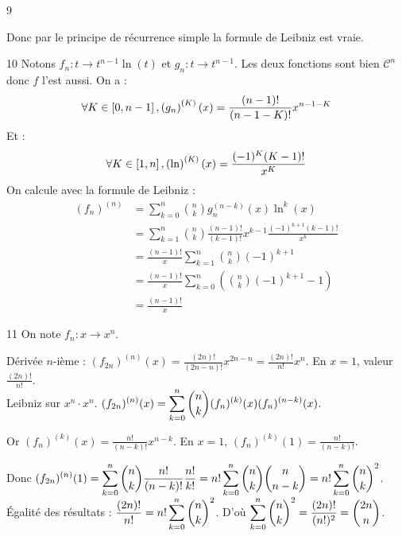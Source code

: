 \begin{correction}{9}
\begin{enumerate}
    Donc par le principe de récurrence simple la formule de Leibniz est vraie.
\end{enumerate}
\end{correction}

\begin{correction}{10}
Notons $f_n: t \to t^{n-1} \ln(t)$ et $g_n: t \to t^{n-1}$.    
Les deux fonctions sont bien $\mathscr C^n$ donc $f$ l'est aussi.
On a :
\[\forall K \in \left[0, n-1\right], \left(g_n\right)^{(K)}(x) = \frac{(n-1)!}{(n-1-K)!}x^{n-1-K}\]
Et :
\[\forall K \in \left[1, n\right], \left(\ln\right)^{(K)}(x) = \frac{(-1)^K(K-1)!}{x^K}\]
On calcule avec la formule de Leibniz :
\begin{align*}
    \left(f_n\right)^{(n)} &= \sum_{k=0}^n \binom{n}{k} g_n^{(n-k)}(x) \ln^{k}(x) \\
    &= \sum_{k=1}^n \binom{n}{k} \frac{(n-1)!}{(k-1)!} x^{k-1} \frac{(-1)^{k+1}(k-1)!}{x^k} \\
    &= \frac{(n-1)!}{x} \sum_{k=1}^n \binom{n}{k} (-1)^{k+1} \\
    &= \frac{(n-1)!}{x} \sum_{k=0}^n \left(\binom{n}{k} (-1)^{k+1} -1\right)\\
    &= \frac{(n-1)!}{x}
\end{align*}
\end{correction}

\begin{correction}{11}
    On note $f_n: x \to x^n$.

    Dérivée $n$-ième : $(f_{2n})^{(n)}(x) = \frac{(2n)!}{(2n-n)!} x^{2n-n} = \frac{(2n)!}{n!} x^n$.
    En $x=1$, valeur $\frac{(2n)!}{n!}$. \\
    
    Leibniz sur $x^n \cdot x^n$.
    $\displaystyle(f_{2n})^{(n)}(x) = \sum_{k=0}^n \binom{n}{k} (f_n)^{(k)}(x) (f_n)^{(n-k)}(x)$.

    Or $(f_n)^{(k)}(x) = \frac{n!}{(n-k)!} x^{n-k}$.
    En $x=1$, $(f_n)^{(k)}(1) = \frac{n!}{(n-k)!}$.

    Donc $\displaystyle (f_{2n})^{(n)}(1) = \sum_{k=0}^n \binom{n}{k} \frac{n!}{(n-k)!} \frac{n!}{k!} = n! \sum_{k=0}^n \binom{n}{k} \binom{n}{n-k} = n! \sum_{k=0}^n \binom{n}{k}^2$. \\

    Égalité des résultats : $\displaystyle \frac{(2n)!}{n!} = n! \sum_{k=0}^n \binom{n}{k}^2$.
    D'où $\displaystyle \sum_{k=0}^n \binom{n}{k}^2 = \frac{(2n)!}{(n!)^2} = \binom{2n}{n}$.
\end{correction}

